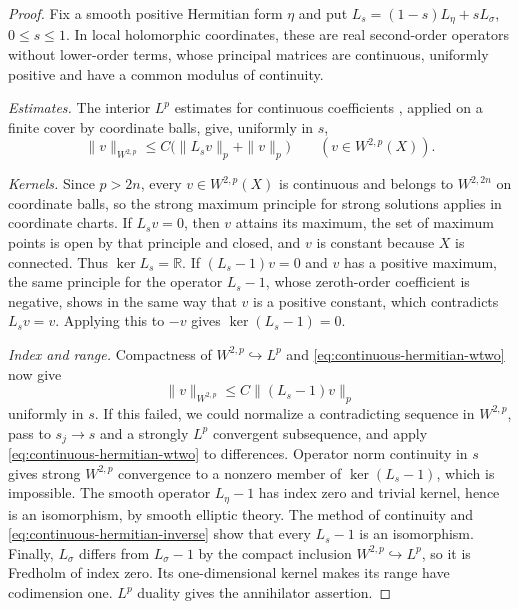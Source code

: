 \begin{proof}
Fix a smooth positive Hermitian form $\eta$ and put
$L_s=(1-s)L_\eta+sL_\sigma$, $0\leq s\leq1$. In local holomorphic
coordinates, these are real second-order operators without lower-order
terms, whose principal matrices are continuous, uniformly positive and
have a common modulus of continuity.

\emph{Estimates.} The interior $L^p$ estimates for continuous
coefficients \cite[Theorem~9.11]{GT01}, applied on a finite cover by
coordinate balls, give, uniformly in $s$,
\begin{equation}\label{eq:continuous-hermitian-wtwo}
 \|v\|_{W^{2,p}}\leq C\bigl(\|L_sv\|_p+\|v\|_p\bigr)
 \qquad(v\in W^{2,p}(X)).
\end{equation}

\emph{Kernels.} Since $p>2n$, every $v\in W^{2,p}(X)$ is continuous
and belongs to $W^{2,2n}$ on coordinate balls, so the strong maximum
principle for strong solutions \cite[Theorem~9.6]{GT01} applies in
coordinate charts. If $L_sv=0$, then $v$ attains its maximum, the set
of maximum points is open by that principle and closed, and $v$ is
constant because $X$ is connected. Thus $\ker L_s=\mathbb R$. If
$(L_s-1)v=0$ and $v$ has a positive maximum, the same principle for the
operator $L_s-1$, whose zeroth-order coefficient is negative, shows in
the same way that $v$ is a positive constant, which contradicts
$L_sv=v$. Applying this to $-v$ gives $\ker(L_s-1)=0$.

\emph{Index and range.} Compactness of $W^{2,p}\hookrightarrow L^p$
and \eqref{eq:continuous-hermitian-wtwo} now give
\begin{equation}\label{eq:continuous-hermitian-inverse}
 \|v\|_{W^{2,p}}\leq C\|(L_s-1)v\|_p
\end{equation}
uniformly in $s$. If this failed, we could normalize a contradicting sequence in
$W^{2,p}$, pass to $s_j\to s$ and a strongly $L^p$ convergent subsequence,
and apply \eqref{eq:continuous-hermitian-wtwo} to differences. Operator
norm continuity in $s$ gives strong $W^{2,p}$ convergence to a nonzero
member of $\ker(L_s-1)$, which is impossible.
The smooth operator $L_\eta-1$ has index zero and trivial kernel, hence
is an isomorphism, by smooth elliptic theory. The method of continuity
\cite[Theorem~5.2]{GT01} and \eqref{eq:continuous-hermitian-inverse}
show that every $L_s-1$ is an isomorphism. Finally, $L_\sigma$ differs
from $L_\sigma-1$ by the compact inclusion $W^{2,p}\hookrightarrow L^p$,
so it is Fredholm of index zero. Its one-dimensional kernel makes its
range have codimension one. $L^p$ duality gives the annihilator
assertion.
\end{proof}
